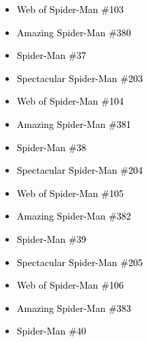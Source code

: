 \documentclass[12pt]{article}
\newcommand{\checkbox}{\raisebox{0.0ex}{\fbox{\rule{0ex}{1.5ex} \rule{1.5ex}{0ex}}}}
\begin{document}
\begin{center}
\begin{tcolorbox}[colback=white!95!gray, colframe=black, width=0.9\textwidth, arc=4mm, auto outer arc, boxrule=0.8pt]
\begin{itemize}[left=0pt,label={\checkbox}]
    \item \textcolor{black}{Web of Spider-Man \#103}
    \item \textcolor{black}{Amazing Spider-Man \#380}
    \item \textcolor{black}{Spider-Man \#37}
    \item \textcolor{black}{Spectacular Spider-Man \#203}
    \item \textcolor{black}{Web of Spider-Man \#104}
    \item \textcolor{black}{Amazing Spider-Man \#381}
    \item \textcolor{black}{Spider-Man \#38}
    \item \textcolor{black}{Spectacular Spider-Man \#204}
    \item \textcolor{black}{Web of Spider-Man \#105}
    \item \textcolor{black}{Amazing Spider-Man \#382}
    \item \textcolor{black}{Spider-Man \#39}
    \item \textcolor{black}{Spectacular Spider-Man \#205}
    \item \textcolor{black}{Web of Spider-Man \#106}
    \item \textcolor{black}{Amazing Spider-Man \#383}
    \item \textcolor{black}{Spider-Man \#40}
\end{itemize}
\end{tcolorbox}
\end{center}
\end{document}
